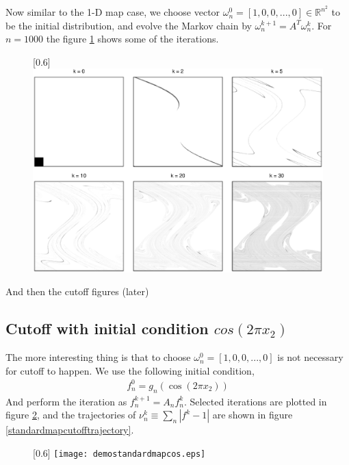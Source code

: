 \documentclass{article}
\begin{document}
Now similar to the 1-D map case, we choose vector $\omega_n^0 = [1,0,0,...,0] \in \mathbb{R}^{n^2} $ to be the initial distribution, and evolve the Markov chain by $\omega_n^{k+1} = A^T \omega_n^{k}$. For $n = 1000$ the figure \ref{demostandardmapsing} shows some of the iterations.
\begin{figure} 
\caption{\label{demostandardmapsing}}
\centerline{\scalebox{0.6}[0.6]{
\includegraphics{demostandardmapsing.eps}
 }
}
\end{figure}
And then the cutoff figures (later)
  

\subsection{Cutoff with initial condition $cos(2\pi x_2)$}
The more interesting thing is that to choose $\omega_n^0 = [1,0,0,...,0]$ is not necessary for cutoff to happen. We use the following initial condition,
\begin{eqnarray}
  f_n^0 = g_n(\cos(2 \pi x_2))
\end{eqnarray}
And perform the iteration as $f_n^{k+1}= A_n f_n^k$. Selected iterations are plotted in figure \ref{demostandardmapcos}, and the trajectories of $\nu^k_n \equiv \sum_n |f^k-1|$ are shown in figure \ref{standardmapcutofftrajectory}. 

    
\begin{figure}
\caption{\label{demostandardmapcos}}
\centerline{\scalebox{0.6}[0.6]{
\texttt{[image: demostandardmapcos.eps]}
}}
\end{figure}
\end{document}
